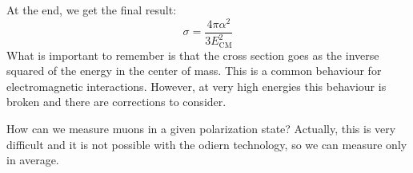 \documentclass[../../main/main.tex]{subfiles}
\begin{document}
At the end, we get the final result:
\begin{equation}
	\sigma
	=
	\frac{4\pi \alpha^2}{3E^2_\mathrm{CM}}
	\label{eq:L06_CS}
\end{equation}
What is important to remember is that the cross section goes as the inverse squared of the energy in the center of mass. This is a common behaviour for electromagnetic interactions. However, at very high energies this behaviour is broken and there are corrections to consider.

How can we measure muons in a given polarization state? Actually, this is very difficult and it is not possible with the odiern technology, so we can measure only in average.
\end{document}
